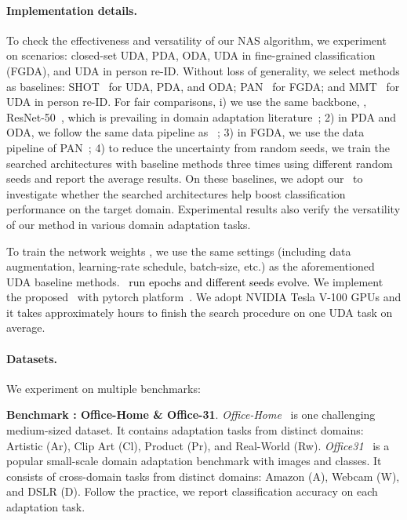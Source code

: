 \documentclass[10pt,twocolumn,letterpaper]{article}
\begin{document}
\paragraph{Implementation details.}
To check the effectiveness and versatility of our NAS algorithm, we experiment on  scenarios: closed-set UDA, PDA, ODA, UDA in fine-grained classification (FGDA), and UDA in person re-ID.
Without loss of generality, we select  \SOTA  methods as baselines: SHOT~\cite{liang2020shot} for UDA, PDA, and ODA; PAN~\cite{wang2020PAN} for FGDA; and MMT~\cite{ge2020MMT} for UDA in person re-ID.
For fair comparisons,
i) we use the same backbone, \ie, ResNet-50~\cite{he2016resnet}, which is prevailing in domain adaptation literature~\cite{long2018CDAN,cui2020BNM,wang2020PAN,ge2020MMT};
2) in PDA and ODA, we follow the same data pipeline as ~\cite{cao2018SAN,cao2019ETN,liu2019STA,liang2020shot};
3) in FGDA, we use the data pipeline of PAN~\cite{wang2020PAN};
4) to reduce the uncertainty from random seeds, we train the searched architectures with baseline methods three times using different random seeds and report the average results.
On these baselines, we adopt our \iMethod\  to investigate whether the searched architectures help boost classification performance on the target domain. Experimental results also verify the versatility of our method in various domain adaptation tasks.

To train the network weights , we use the same settings (including data augmentation, learning-rate schedule, batch-size, etc.) as the aforementioned UDA baseline methods.
\textcolor{black}{\iMethod\, run  epochs and  different seeds evolve.}
We implement the proposed \iMethod\, with pytorch platform~\cite{paszke2019pytorch}.
We adopt  NVIDIA Tesla V-100 GPUs and it takes approximately  hours to finish the search procedure on one UDA task on average.

\vspace{-4mm}
\paragraph{Datasets.} We experiment on multiple benchmarks:

\textbf{Benchmark : Office-Home \& Office-31}.
\textit{Office-Home}~\cite{venkateswara2017officehome} is one challenging medium-sized dataset. It contains  adaptation tasks from  distinct domains: Artistic (Ar), Clip Art (Cl), Product (Pr), and Real-World (Rw).
\textit{Office31}~\cite{saenko2010office31} is a popular small-scale domain adaptation benchmark with  images and  classes. It consists of  cross-domain tasks from  distinct domains: Amazon (A), Webcam (W), and DSLR (D).
Follow the practice, we report classification accuracy on each adaptation task.
\end{document}
